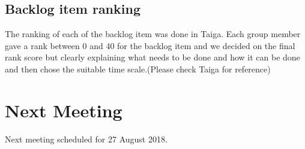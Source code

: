 \documentclass[11pt]{article}
\begin{document}
\subsection{Backlog item ranking}
The ranking of each of the backlog item was done in Taiga. Each group member gave a rank between 0 and 40 for the backlog item and we decided on the final rank score but clearly explaining what needs to be done and how it can be done and then chose the suitable time scale.(Please check Taiga for reference)

\section{Next Meeting}
Next meeting scheduled for 27 August 2018.
\end{document}
